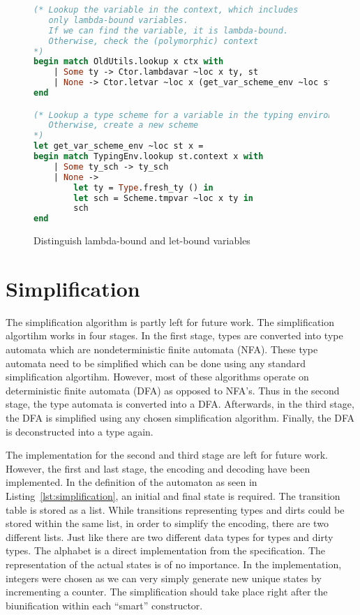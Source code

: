 \begin{figure}
\caption{Distinguish lambda-bound and let-bound variables}
\label{lst:var}
\begin{lstlisting}[language=Caml]
(* Lookup the variable in the context, which includes
   only lambda-bound variables.
   If we can find the variable, it is lambda-bound.
   Otherwise, check the (polymorphic) context 
*)
begin match OldUtils.lookup x ctx with
    | Some ty -> Ctor.lambdavar ~loc x ty, st
    | None -> Ctor.letvar ~loc x (get_var_scheme_env ~loc st x), st
end

(* Lookup a type scheme for a variable in the typing environment
   Otherwise, create a new scheme
*)
let get_var_scheme_env ~loc st x =
begin match TypingEnv.lookup st.context x with
    | Some ty_sch -> ty_sch
    | None -> 
        let ty = Type.fresh_ty () in
        let sch = Scheme.tmpvar ~loc x ty in
        sch
end
\end{lstlisting}
\end{figure}

\section{Simplification}
The simplification algorithm is partly left for future work. The simplification algortihm works in four stages. In the first stage, types are converted into type automata which are nondeterministic finite automata (NFA). These type automata need to be simplified which can be done using any standard simplification algortihm. However, most of these algorithms operate on deterministic finite automata (DFA) as opposed to NFA's. Thus in the second stage, the type automata is converted into a DFA. Afterwards, in the third stage, the DFA is simplified using any chosen simplification algorithm. Finally, the DFA is deconstructed into a type again.

The implementation for the second and third stage are left for future work. However, the first and last stage, the encoding and decoding have been implemented. In the definition of the automaton as seen in Listing~\ref{lst:simplification}, an initial and final state is required. The transition table is stored as a list. While transitions representing types and dirts could be stored within the same list, in order to simplify the encoding, there are two different lists. Just like there are two different data types for types and dirty types. The alphabet is a direct implementation from the specification. The representation of the actual states is of no importance. In the implementation, integers were chosen as we can very simply generate new unique states by incrementing a counter. The simplification should take place right after the biunification within each ``smart'' constructor. 

